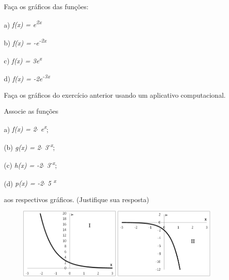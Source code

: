 \begin{exercicios}
\exitem{} Faça os gráficos das funções:

a) \textit{f(x) = e\textsuperscript{2x}}

b) \textit{f(x) = -e\textsuperscript{-2x  }}

c) \textit{f(x) = 3e\textsuperscript{x}}

d) \textit{f(x) = -2e\textsuperscript{-3x}}

\item Faça os gráficos do exercício anterior usando um aplicativo computacional.

\exitem{} Associe as funções 

a) \textit{f(x) = 2$ \cdot $ e\textsuperscript{x}};

(b) \textit{g(x) = 2$ \cdot $ 3\textsuperscript{-x}};

(c) \textit{h(x) = -2$ \cdot $ 3\textsuperscript{-x}};

(d) \textit{p(x) = -2$ \cdot $ 5 \textsuperscript{x}}

aos respectivos gráficos. (Justifique sua resposta)

\begin{figure}[H]
    \includegraphics[width=0.45\textwidth]{capitulos/potencias_e_funcoes_exponenciais/media/image17.png} 
    \includegraphics[width=0.45\textwidth]{capitulos/potencias_e_funcoes_exponenciais/media/image18.png}
\end{figure}


\end{exercicios}

